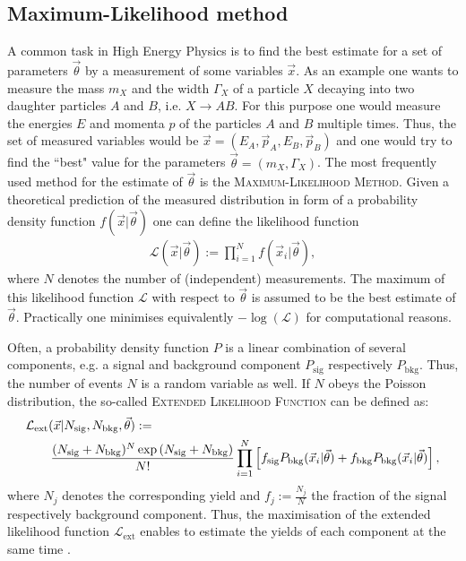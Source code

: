 \subsection{Maximum-Likelihood method}
A common task in High Energy Physics is to find the best estimate for a set of parameters $\vec{\theta}$ by a measurement of some variables $\vec{x}$.
As an example one wants to measure the mass $m_X$  and the width $\Gamma_X$ of a particle $X$ decaying into two daughter particles $A$ and $B$, i.e. $X \to AB$.
For this purpose one would measure the energies $E$ and momenta $p$ of the particles $A$ and $B$ multiple times.
Thus, the set of measured variables would be $\vec{x} = (E_A, \vec{p}_A, E_B, \vec{p}_B)$ and one would try to find the ``best" value for the parameters $\vec{\theta} = (m_X, \Gamma_X)$. 
The most frequently used method for the estimate of $\vec{\theta}$ is the \textsc{Maximum-Likelihood Method}.
Given a theoretical prediction of the measured distribution in form of a probability density function $f(\vec{x}|\vec{\theta})$ one can define the likelihood function
\begin{align}
    \mathcal{L}(\vec{x}|\vec{\theta}) := \prod_{i=1}^{N} f(\vec{x}_i|\vec{\theta}),
\end{align}
where $N$ denotes the number of (independent) measurements.
The maximum of this likelihood function $\mathcal{L}$ with respect to $\vec{\theta}$ is assumed to be the best estimate of $\vec{\theta}$.
Practically one minimises equivalently $-\log(\mathcal{L})$ for computational reasons.

Often, a probability density function $P$ is a linear combination of several components, e.g. a signal and background component $P_\text{sig}$ respectively $P_\text{bkg}$.
Thus, the number of events $N$ is a random variable as well.
If $N$ obeys the Poisson distribution, the so-called \textsc{Extended Likelihood Function} can be defined as: 
\begin{align}
    &\mathcal{L}_\text{ext}(\vec{x} | \Nsig, \Nbkg, \vec{\theta}) :=  \nonumber \\ 
    &\qquad \frac{(\Nsig+\Nbkg)^N\exp{(\Nsig+\Nbkg)}}{N!} \prod_{i=1}^{N} \left[f_\text{sig}P_\text{bkg}(\vec{x}_i|\vec{\theta}) + f_\text{bkg}P_\text{bkg}(\vec{x}_i|\vec{\theta})\right],
\end{align} 
where $N_j$ denotes the corresponding yield and $f_j:=\frac{N_j}{N}$ the fraction of the signal respectively background component.
Thus, the maximisation of the extended likelihood function $\mathcal{L}_\text{ext}$ enables to estimate the yields of each component at the same time \cite{Lista_Statistics, PDG}.

